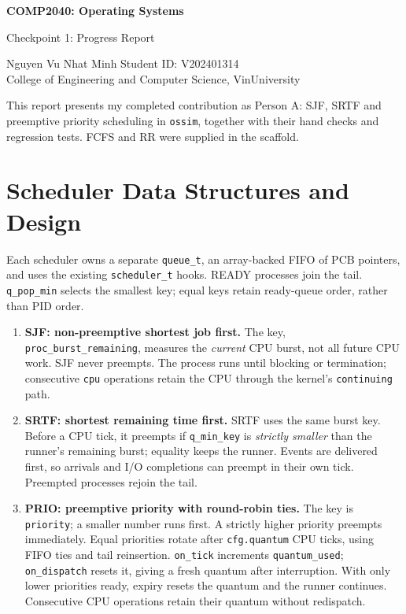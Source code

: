\documentclass[11pt,a4paper]{article}
\newcommand{\code}[1]{\texttt{#1}}
\begin{document}
\begin{center}
  {\Large\bfseries COMP2040: Operating Systems\par}
  \vspace{3pt}
  {\large Checkpoint 1: Progress Report\par}
  \vspace{5pt}
  Nguyen Vu Nhat Minh \quad Student ID: V202401314\\
  {\small College of Engineering and Computer Science, VinUniversity}
\end{center}

This report presents my completed contribution as Person A: SJF, SRTF
and preemptive priority scheduling in \code{ossim}, together with their
hand checks and regression tests. FCFS and RR were supplied in the scaffold.

\section{Scheduler Data Structures and Design}

Each scheduler owns a separate \code{queue\_t}, an array-backed FIFO of
PCB pointers, and uses the existing \code{scheduler\_t} hooks. READY
processes join the tail. \code{q\_pop\_min} selects the smallest key;
equal keys retain ready-queue order, rather than PID order.

\begin{enumerate}
\item \textbf{SJF: non-preemptive shortest job first.}
The key, \code{proc\_burst\_remaining}, measures the \emph{current}
CPU burst, not all future CPU work. SJF never preempts. The process runs
until blocking or termination; consecutive \code{cpu} operations retain
the CPU through the kernel's \code{continuing} path.

\item \textbf{SRTF: shortest remaining time first.}
SRTF uses the same burst key. Before a CPU tick, it preempts if
\code{q\_min\_key} is \emph{strictly smaller} than the runner's remaining
burst; equality keeps the runner. Events are delivered first, so arrivals
and I/O completions can preempt in their own tick. Preempted processes
rejoin the tail.

\item \textbf{PRIO: preemptive priority with round-robin ties.}
The key is \code{priority}; a smaller number runs first. A strictly
higher priority preempts immediately. Equal priorities rotate after
\code{cfg.quantum} CPU ticks, using FIFO ties and tail reinsertion.
\code{on\_tick} increments \code{quantum\_used}; \code{on\_dispatch}
resets it, giving a fresh quantum after interruption. With only lower
priorities ready, expiry resets the quantum and the runner continues.
Consecutive CPU operations retain their quantum without redispatch.
\end{enumerate}
\end{document}
